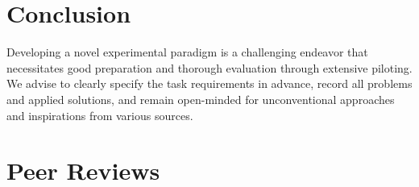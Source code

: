 \documentclass[twocolumn, serif, authordate, review]{jote-article}
\begin{document}
{}
\section*{Conclusion} 
\gotoreview
\label{sec:conclusion}

\noindent Developing a novel experimental paradigm is a challenging endeavor that necessitates good preparation and thorough evaluation through extensive piloting. We advise to clearly specify the task requirements in advance, record all problems and applied solutions, and remain open-minded for unconventional approaches and inspirations from various sources.


\newpage

{}
\section*{Peer Reviews}
\label{sec:reviews}
\end{document}
